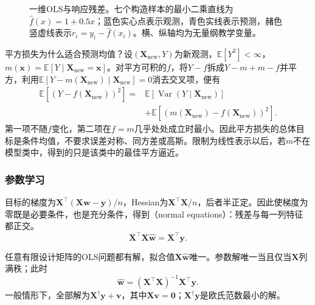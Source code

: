 \begin{figure}[htbp]
  \centering
  
  \caption{一维OLS与响应残差。七个构造样本的最小二乘直线为$\widehat f(x)=1+0.5x$；蓝色实心点表示观测，青色实线表示预测，赭色竖虚线表示$r_i=y_i-\widehat f(x_i)$。横、纵轴均为无量纲教学变量。}
  \label{fig:regression-ols-residuals}
\end{figure}

平方损失为什么适合预测均值？设$(\bm{X}_{\mathrm{new}},Y)$为新观测，$\mathbb{E}[Y^2]<\infty$，$m(\bm{x})=\mathbb{E}[Y\mid\bm{X}_{\mathrm{new}}=\bm{x}]$。对平方可积的$f$，将$Y-f$拆成$Y-m+m-f$并平方，利用$\mathbb{E}[Y-m(\bm{X}_{\mathrm{new}})\mid\bm{X}_{\mathrm{new}}]=0$消去交叉项，便有
\begin{equation}
  \begin{aligned}
    \mathbb{E}[(Y-f(\bm{X}_{\mathrm{new}}))^2]
    ={}&\mathbb{E}[\operatorname{Var}(Y\mid\bm{X}_{\mathrm{new}})]\\
       &+\mathbb{E}[(m(\bm{X}_{\mathrm{new}})-f(\bm{X}_{\mathrm{new}}))^2].
  \end{aligned}
  \label{eq:regression-risk-decomposition}
\end{equation}
第一项不随$f$变化，第二项在$f=m$几乎处处成立时最小。因此平方损失的总体目标是条件均值，不要求误差对称、同方差或高斯。限制为线性表示以后，若$m$不在模型类中，得到的只是该类中的最佳平方逼近。

\subsubsection{参数学习}
\label{sec:regression-ols-learning}

目标的梯度为$\bm{X}^{\top}(\bm{X}\bm{w}-\bm{y})/n$，Hessian为$\bm{X}^{\top}\bm{X}/n$，后者半正定。因此使梯度为零既是必要条件，也是充分条件，得到（normal equations）：残差与每一列特征都正交。
\begin{equation}
  \bm{X}^{\top}\bm{X}\widehat{\bm{w}}=\bm{X}^{\top}\bm{y}.
  \label{eq:regression-normal-equations}
\end{equation}

\begin{theorem}[最小二乘解的存在与唯一性]
  \label{thm:regression-ols-solutions}
  任意有限设计矩阵的OLS问题都有解，拟合值$\bm{X}\widehat{\bm{w}}$唯一。参数解唯一当且仅当$\bm{X}$列满秩；此时
  \[
    \widehat{\bm{w}}=(\bm{X}^{\top}\bm{X})^{-1}\bm{X}^{\top}\bm{y}.
  \]
  一般情形下，全部解为$\bm{X}^{\dagger}\bm{y}+\bm{v}$，其中$\bm{X}\bm{v}=\bm{0}$；$\bm{X}^{\dagger}\bm{y}$是欧氏范数最小的解。
\end{theorem}

